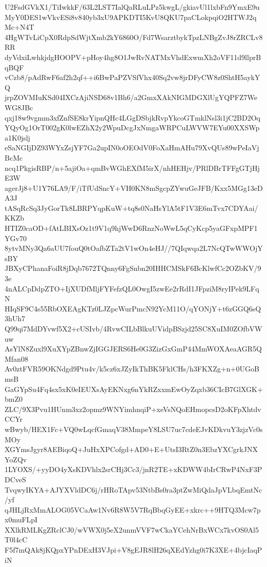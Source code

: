 U2FsdGVkX1/TiIwkkF/63L2LST7IalQaRLuLPz5kwgL/gkiavUl1lxbFn9YmxE9u
MyY0DES1wVkvESi8v840yb3xU9APKDTI5KvU8QKU7paCLokpqiO2HTWJ2qMc+N4T
4HgWTvLiCpX0RdpSdWjtXmb2kY6860O/Fd7WsarztbykTpzLNBgZvJ8rZRCLv8RR
dyVdxiLwhkjdgHOOPV+pHoy4hg8O1JwRvNATMxVhdExwmXh2oVF11d9llprBqBQF
vCzb8/pAdRwF6af2h2qf++i6BwPaPZVSfVhx40Sq2vw8jrDFyCW8z0ShtH5aykYQ
jrpZOVMIuKSd04IXCzAjiNSD68v1Bh6/a2GmxXAkNIGMDGXlUgYQPFZ7WeWG8JBc
qxj18w9vgmm3xfZnfSE8krYipnQHc4LGgDSbjkRvpYkcoGTmklNsl3i1jC2BD2Oq
YQyOg1OrT002gK0lwEZhX2y2WpuDcgJxNmgaWRPCuLWVW7EYu00XXSWpa1K0jslj
eSaNGIjDZ93WYxZsjYF7Ga2upIN0oOEOdV0FoXaHmAHu79XvQUs89wPeIaVjBcMc
ncq1PkgisRBP/n+5ajiOa+qmBvWGhEXfM5irX/nhHEHjv/PRlDBrTFFgGTjHjE3W
agerJj8+U1Y76LA9/F/iTfUdSncY+VH0KN8mSgcpZYwuGeJFB/Kxx5MGg13eDA3J
tASqRcSq3JyGorTk8LBRPYqpKuW+tq8s0NaHsYlA5tF1V3E6mTvx7CDYAai/KKZb
HTIZ0caOD+fAtLBIXsOz1t9V1q9hjWwD6RnzNoWwL5qCyKcp5yaGFxpMPF1YGv70
8ytvMNy3Qa6aUU7fouQ0tOafbZTa2tV1wOn4eHJ//7QIqwqa2L7NcQTwWWOjYsBY
JBXyCPhanaFoiR8jDqb7672TQnny6FgSnbn20IHHCMSkF6BcKlwfCc2OZbKV/93e
4nALCpDdpZTO+IjXUDfMljFYFefzQL0OwgI5zwEe2rRdI1JFpziM8ryIPek9LFqN
HIqSF9C4s55RbOXEAgKTz0LJZpcWurPmcN92YcM11O/qYONjY+t6zGGQ6sQ3hUh7
Q99qi7MdDYvwf5X2+cUSIvb/4RvwCILbBlkuUVidpBSzjd25SC8XuIM0ZOfbVWuw
AsYlN8Zuxl9XuXYpZBnwZjIGGJERS6He0G3ZizGxGmP44MmWOXAeaAGR5QMfan08
Av0ztFVR59OKNdgd9Ptu4v/k5cz6xJZyIkThBK5FklCHs/h3FKXZg+n+0UGoBmsB
GaGYpSu4Fq4sx5xK0eIEUXsAyEKNxg6nYkRZxxmEwOyZqxb36CIcB7GlXGK+bmZ0
ZLC/9X3Pvu1HUnm3xz2opmz9WNYimhnqiP+xeVsNQoEHmopcsD2oKFpXhtdvCCYr
wBwyb/HEX1Fc+VQ0wLqcfGmaqV38MmpeY8LSU7uc7cdeEJvKDkvuY3zjzVc0sMOy
XGYmsJgyr8AEBiqoQ+JuHxXPCofgd+AD0+E+UtsI3RtZ0n3EbzYXCgrkJNXYoZQv
1LYOXS/+yyDO4yXsKDVhlx2srCHj3Cc3/jnR2TE+xKDWW4bIrCRwP4NxF3PDCveS
TvqwyIKYA+AJYXVldDC6j/rHRoTApv53NtbBs0ra3ptZwMiQdaJpVLbqEmtNc/yf
qJHLjRxMmALOG05VCaAw1Nv6R8W5V7RqBbqGyEE+xkrc++9HTQ3Mcw7px0muFLpI
XXlkRMLKgZRclCJ0/wVWX0j5eX2unmVVF7wCkaYCehNrBxWCx7kvOS0Al5T0l4cC
F5f7mQAk8jKQpxYPnDExH3VJpi+V8gEJR8lH26qXEdYzhg0i7K3XE+4bjcIaqPiN
